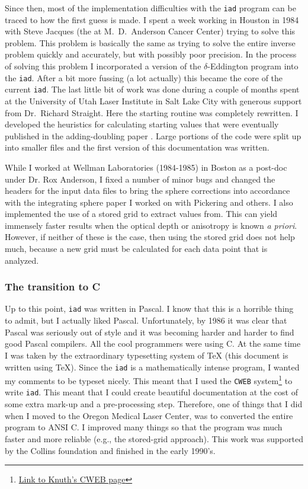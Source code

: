 \documentclass{article}
\newcommand\iadprog{\texttt{iad}}
\begin{document}
Since then, most of the implementation difficulties with the \iadprog{} program can be traced
to how the first guess is made.  I spent a week working in Houston in 1984 with
Steve Jacques (the at M.\ D.\ Anderson Cancer Center) trying to solve this problem.   
This problem is basically the same as trying to solve the entire inverse problem quickly and accurately, 
but with possibly poor precision.  In the process of solving this problem I incorporated
a version of the $\delta$-Eddington program into the \iadprog{}.  
 After a bit more fussing (a lot actually) this became the core of the current \iadprog{}.
The last
little bit of work was done during  a couple of months spent at the University of
Utah Laser Institute in Salt Lake City with generous support from Dr.\ Richard Straight.  
Here the starting routine was completely rewritten.  I
developed the heuristics for calculating starting values that were eventually published in the
adding-doubling paper \cite{prahl93a}.  Large portions of the code were split up
into smaller files and the first version of this documentation was written.

While I worked at Wellman Laboratories (1984-1985) in Boston as a post-doc under Dr. Rox Anderson, 
I fixed a number of minor bugs and
changed the headers for the input data files to bring the sphere
corrections into accordance with the integrating sphere paper I worked on with Pickering and
others.  I also implemented the use of a stored grid to extract values from. 
This can yield immensely faster results when the optical depth or anisotropy is
known \emph{a priori}.  However, if neither of these is the case, then using the
stored grid does not help much, because a new grid must be calculated for each
data point that is analyzed.

\subsubsection*{The transition to C}

Up to this point, \iadprog{} was written in Pascal.  I know that this is a horrible
thing to admit, but I actually liked Pascal.  Unfortunately, by 1986 it was clear
that Pascal was seriously out of style and it was becoming harder and harder to
find good Pascal compilers.  All the cool programmers
were using C.  At the same time I was taken by the extraordinary 
typesetting system of \TeX{} (this document is written using \TeX).  Since the \iadprog{} is a mathematically 
intense program, I wanted my comments to be typeset nicely.  This meant that I
used the \texttt{CWEB} system\footnote{\href{http://www-cs-faculty.stanford.edu/~uno/cweb.html}{Link to Knuth's CWEB page}}
 to write \iadprog{}.  This meant that I could
create beautiful documentation at the cost of some extra mark-up and a pre-processing
step.  Therefore, one of things that I did when I moved to the Oregon Medical Laser Center, 
was to converted the entire program to ANSI C.  I improved many things so that the program was much faster and more
reliable (e.g., the stored-grid approach). This work was
supported by the Collins foundation and finished in the early 1990's.
\end{document}

